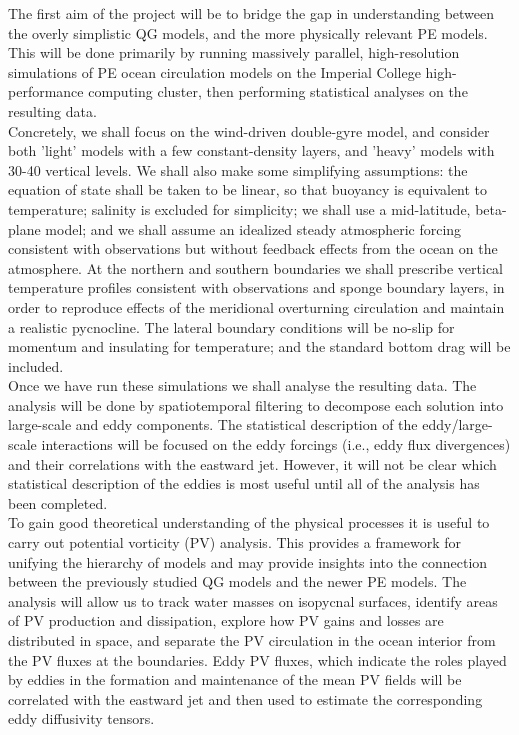 \documentclass[10pt]{article}
\begin{document}
\linebreak
The first aim of the project will be to bridge the gap in understanding between the overly simplistic QG models, and the more physically relevant PE models. This will be done primarily by running massively parallel, high-resolution simulations of PE ocean circulation models on the Imperial College high-performance computing cluster, then performing statistical analyses on the resulting data. \\
\linebreak
Concretely, we shall focus on the wind-driven double-gyre model, and consider both 'light' models with a few constant-density layers, and 'heavy' models with 30-40 vertical levels.  We shall also make some simplifying assumptions: the equation of state shall be taken to be linear, so that buoyancy is equivalent to temperature; salinity is excluded for simplicity; we shall use a mid-latitude, beta-plane model; and we shall assume an idealized steady atmospheric forcing consistent with observations but without feedback effects from the ocean on the atmosphere. At the northern and southern boundaries we shall prescribe vertical temperature profiles consistent with observations and sponge boundary layers, in order to reproduce effects of the meridional overturning circulation and maintain a realistic pycnocline. The lateral boundary conditions will be no-slip for momentum and insulating for temperature; and the standard bottom drag will be included.
\\ 
\linebreak
Once we have run these simulations we shall analyse the resulting data. The analysis will be done by spatiotemporal filtering to decompose each solution into large-scale and eddy components. The statistical description of the eddy/large-scale interactions will be focused on the eddy forcings (i.e., eddy
flux divergences) and their correlations with the eastward jet. However, it will not be clear which statistical description of the eddies is most useful until all of the analysis has been completed. \\
\linebreak
To gain good theoretical understanding of the physical processes it is useful to carry out potential vorticity (PV) analysis. This provides a framework for unifying the hierarchy of models and may provide insights into the connection between the previously studied QG models and the newer PE models. The analysis will allow us to track water masses on isopycnal surfaces, identify areas of PV production and dissipation, explore how PV gains and losses are distributed in space, and separate the PV circulation in the ocean interior from the PV fluxes at the boundaries. Eddy PV fluxes, which indicate the roles played by eddies in the formation and maintenance of the mean PV fields will be correlated with the eastward jet and then used to estimate the corresponding eddy diffusivity tensors.\\
\end{document}

